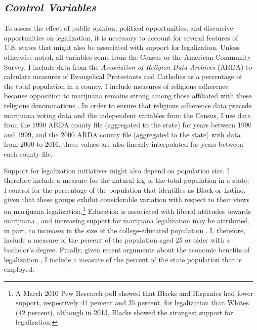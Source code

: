 \subsection{\it{Control Variables}}

To assess the effect of public opinion, political opportunities, and discursive opportunities on legalization, it is necessary to account for several features of U.S. states that might also be associated with support for legalization. Unless otherwise noted, all variables come from the Census or the American Community Survey. I include data from the {\it{Association of Religion Data Archives}} (ARDA) to calculate measures of Evangelical Protestants and Catholics as a percentage of the total population in a county. I include measures of religious adherence because opposition to marijuana remains strong among those affiliated with these religious denominations \citep{caulkins_et_al_2012,palamar_2014}. In order to ensure that religious adherence data precede marijuana voting data and the independent variables from the Census, I use data from the 1990 ARDA county file (aggregated to the state) for years between 1990 and 1999, and the 2000 ARDA county file (aggregated to the state) with data from 2000 to 2016, these values are also linearly interpolated for years between each county file. 

Support for legalization initiatives might also depend on population size. I therefore include a measure for the natural log of the total population in a state. I control for the percentage of the population that identifies as Black or Latino, given that these groups exhibit considerable variation with respect to their views on marijuana legalization.\footnote{A March 2010 Pew Research poll showed that Blacks and Hispanics had lower support, respectively 41 percent and 35 percent, for legalization than Whites (42 percent), although in 2013, Blacks showed the strongest support for legalization.} Education is associated with liberal attitudes towards marijuana \citep{pedersen_2009}, and increasing support for marijuana legalization may be attributed, in part, to increases in the size of the college-educated population \citep{rosenthal_and_kubby_1996}. I, therefore, include a measure of the percent of the population aged 25 or older with a bachelor's degree. Finally, given recent arguments about the economic benefits of legalization \citep{mosher_and_akins_2019}, I include a measure of the percent of the state population that is employed. %




